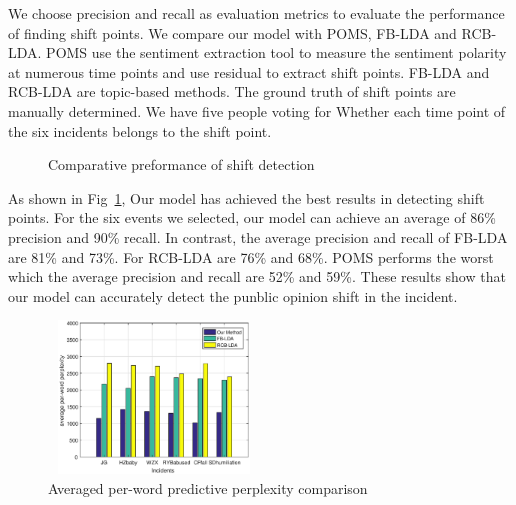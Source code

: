 \documentclass[runningheads]{llncs}
\begin{document}
We choose precision and recall as evaluation metrics to evaluate the performance of finding shift points. We compare our model with POMS, FB-LDA and RCB-LDA. POMS use the sentiment extraction tool to measure the sentiment polarity at numerous time points and use residual to extract shift points. FB-LDA and RCB-LDA are topic-based methods. The ground truth of shift points are manually determined. We have five people voting for Whether each time point of the six incidents belongs to the shift point. 
\begin{figure}
\centering
{}
\hspace{-4ex}
\setlength{\abovecaptionskip}{-0.1cm}
\caption{Comparative preformance of shift detection}\label{fig:shift}
\end{figure}

As shown in Fig~\ref{fig:shift}, Our model has achieved the best results in detecting shift points. For the six events we selected, our model can achieve an average of 86\% precision and 90\% recall. In contrast, the average precision and recall of FB-LDA are 81\% and 73\%. For RCB-LDA are 76\% and 68\%. POMS performs the worst which the average precision and recall are 52\% and 59\%. These results show that our model can accurately detect the punblic opinion shift in the incident.

\vspace{-0.5cm}
\begin{figure}
    \centering
    \includegraphics[width=0.5\textwidth,height=1.6in]{perplexity.eps}
    \setlength{\abovecaptionskip}{-0.1cm}
    \caption{Averaged per-word predictive perplexity comparison}\label{fig:perplexity}
\end{figure}
\end{document}

